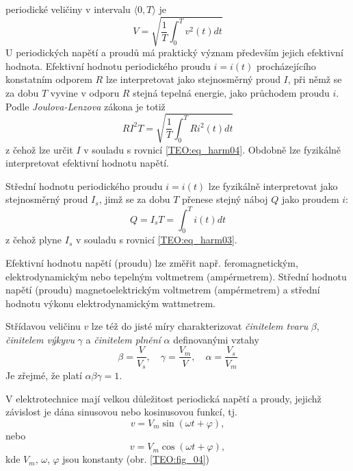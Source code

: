      periodické veličiny v intervalu $\langle 0, T\rangle$ je 
    \begin{equation}\label{TEO:eq_harm04}
      V = \sqrt{\frac{1}{T}\int_{0}^{T}v^2(t)dt}
    \end{equation}   
    U periodických napětí a proudů má praktický význam především jejich efektivní hodnota.
    Efektivní hodnotu periodického proudu $i=i(t)$ procházejícího konstatním odporem $R$ lze
    interpretovat jako stejnosměrný proud $I$, při němž se za dobu $T$ vyvine v odporu $R$ stejná
    tepelná energie, jako průchodem proudu $i$. Podle \emph{Joulova-Lenzova} zákona je totiž
    \begin{equation}\label{TEO:eq_harm05}
      RI^2T = \sqrt{\frac{1}{T}\int_{0}^{T}Ri^2(t)dt}
    \end{equation}       
    z čehož lze určit $I$ v souladu s rovnicí \ref{TEO:eq_harm04}. Obdobně lze fyzikálně
    interpretovat efektivní hodnotu napětí.
    
    Střední hodnotu periodického proudu $i=i(t)$ lze fyzikálně interpretovat jako stejnosměrný
    proud $I_s$, jimž se za dobu $T$ přenese stejný náboj $Q$ jako proudem $i$:
    \begin{equation}\label{TEO:eq_harm06}
      Q = I_sT = \int_{0}^{T}i(t)dt
    \end{equation}       
    z čehož plyne $I_s$ v souladu s rovnicí \ref{TEO:eq_harm03}.  
    
    Efektivní hodnotu napětí (proudu) lze změřit např. feromagnetickým, elektrodynamickým nebo
    tepelným voltmetrem (ampérmetrem). Střední hodnotu napětí (proudu) magnetoelektrickým
    voltmetrem (ampérmetrem) a střední hodnotu výkonu elektrodynamickým wattmetrem.
 
          
         
    Střídavou veličinu $v$ lze též do jisté míry charakterizovat \emph{činitelem tvaru} $\beta$,
    \emph{činitelem výkyvu} $\gamma$ a \emph{činitelem plnění} $\alpha$ definovanými vztahy
    \begin{equation}\label{TEO:eq_harm07}
      \beta = \frac{V}{V_s}, \quad \gamma = \frac{V_m}{V}, \quad \alpha = \frac{V_s}{V_m}
    \end{equation}    
    Je zřejmé, že platí $\alpha\beta\gamma = 1$.
    
    V elektrotechnice mají velkou důležitost periodická napětí a proudy, jejichž závislost je dána
    sinusovou nebo kosinusovou funkcí, tj.
    \begin{equation}\label{TEO:eq_harm08}
      v = V_m\sin(\omega t + \varphi),
    \end{equation}        
    nebo
    \begin{equation}\label{TEO:eq_harm09}
      v = V_m\cos(\omega t + \varphi),
    \end{equation}  
    kde $V_m$, $\omega$, $\varphi$ jsou konstanty (obr. \ref{TEO:fig_04})
    
